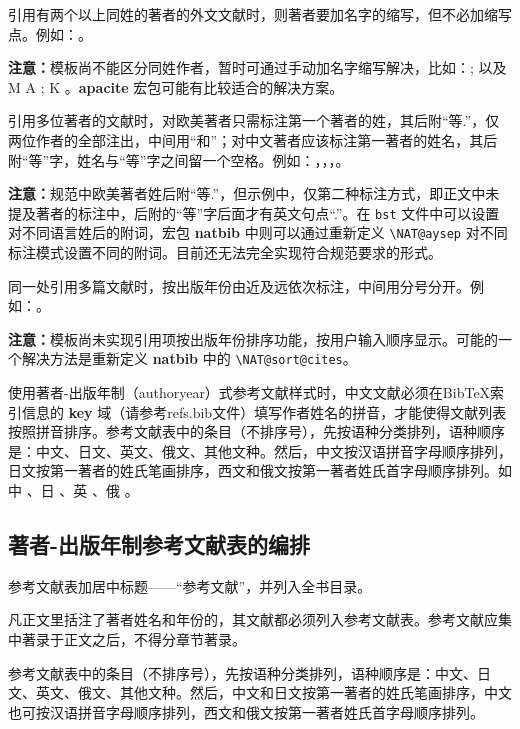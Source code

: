 引用有两个以上同姓的著者的外文文献时，则著者要加名字的缩写，但不必加缩写点。例如：\citep{nadkarni1992,nadkarni1992mechanism}。

\textbf{注意：}模板尚不能区分同姓作者，暂时可通过手动加名字缩写解决，比如：\citep[M A ][]{nadkarni1992}; \citep[K][]{nadkarni1992mechanism}以及 M A \citet{nadkarni1992}; K \citet{nadkarni1992mechanism}。\textbf{apacite} 宏包可能有比较适合的解决方案。%

引用多位著者的文献时，对欧美著者只需标注第一个著者的姓，其后附“等.”，仅两位作者的全部注出，中间用“和”；对中文著者应该标注第一著者的姓名，其后附“等”字，姓名与“等”字之间留一个空格。例如：\citep{nadkarni1992}，\citep{nair1992}，\citep{zhu1973}，\citep{hua1973}。

\textbf{注意：}规范中欧美著者姓后附“等.”，但示例中，仅第二种标注方式，即正文中未提及著者的标注中，后附的“等”字后面才有英文句点“.”。在 \texttt{bst} 文件中可以设置对不同语言姓后的附词，宏包 \textbf{natbib} 中则可以通过重新定义 \verb|\NAT@aysep| 对不同标注模式设置不同的附词。目前还无法完全实现符合规范要求的形式。%

同一处引用多篇文献时，按出版年份由近及远依次标注，中间用分号分开。例如：\citet{nadkarni1992,hua1973,huo1981,timoshenko1959,ding2001}。

\textbf{注意：}模板尚未实现引用项按出版年份排序功能，按用户输入顺序显示。可能的一个解决方法是重新定义 \textbf{natbib} 中的 \verb|\NAT@sort@cites|。 %

使用著者-出版年制（authoryear）式参考文献样式时，中文文献必须在BibTeX索引信息的 \textbf{key} 域（请参考refs.bib文件）填写作者姓名的拼音，才能使得文献列表按照拼音排序。参考文献表中的条目（不排序号），先按语种分类排列，语种顺序是：中文、日文、英文、俄文、其他文种。然后，中文按汉语拼音字母顺序排列，日文按第一著者的姓氏笔画排序，西文和俄文按第一著者姓氏首字母顺序排列。如中 \citep{niu2013zonghe}、日 \citep{Bohan1928}、英 \citep{stamerjohanns2009mathml}、俄 \citep{Dubrovin1906}。

\subsection{著者-出版年制参考文献表的编排}

参考文献表加居中标题——“参考文献”，并列入全书目录。

凡正文里括注了著者姓名和年份的，其文献都必须列入参考文献表。参考文献应集中著录于正文之后，不得分章节著录。

参考文献表中的条目（不排序号），先按语种分类排列，语种顺序是：中文、日文、英文、俄文、其他文种。然后，中文和日文按第一著者的姓氏笔画排序，中文也可按汉语拼音字母顺序排列，西文和俄文按第一著者姓氏首字母顺序排列。

